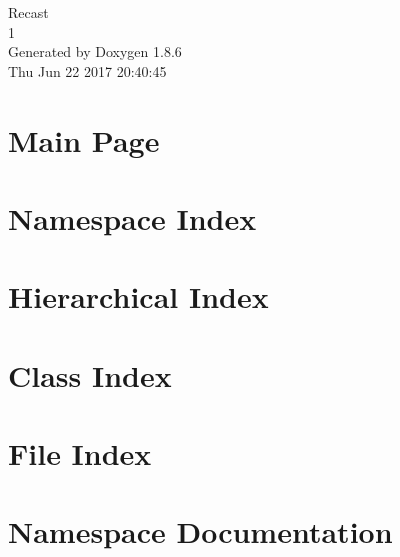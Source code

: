 \documentclass[twoside]{book}
\newcommand{\clearemptydoublepage}{%
  \newpage{\pagestyle{empty}\cleardoublepage}%
}
\begin{document}
\hypersetup{pageanchor=false}
\begin{titlepage}
\vspace*{7cm}
\begin{center}%
{\Large Recast \\[1ex]\large 1 }\\
\vspace*{1cm}
{\large Generated by Doxygen 1.8.6}\\
\vspace*{0.5cm}
{\small Thu Jun 22 2017 20:40:45}\\
\end{center}
\end{titlepage}
\clearemptydoublepage
\tableofcontents
\clearemptydoublepage
{}
\hypersetup{pageanchor=true}

\chapter{Main Page}
\label{index}\hypertarget{index}{}
\chapter{Namespace Index}

\chapter{Hierarchical Index}

\chapter{Class Index}

\chapter{File Index}

\chapter{Namespace Documentation}
























\end{document}
